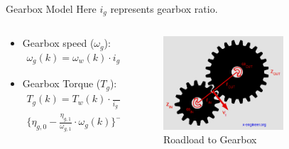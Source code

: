 \documentclass{beamer}
\begin{document}
\begin{frame}{Gearbox Model}
Here $i_g$ represents gearbox ratio.

\begin{columns}
\begin{column}{0.5\textwidth}
\begin{itemize}
    \item Gearbox speed ($\omega_g$): \\ \begin{align*}
        \omega_g(k) = \omega_w(k) \cdot i_g(k)
    \end{align*}
    
    \item Gearbox Torque ($T_g$): \\ \begin{align*}
T_g(k) = T_w(k) \cdot \frac{1}{i_g(k)} \cdot \\{\bigg\{\eta_{g,0} - \frac{\eta_{g,1}}{\omega_{g,1} } \cdot \omega_g(k)\bigg\}^{-sign(T_w(k))}}
\end{align*}
\end{itemize}
    
\end{column}
\begin{column}{0.5\textwidth}
    \begin{figure}
    \centering
        \includegraphics[width=0.7\textwidth]{gearbox model.png}
        \caption{Roadload to Gearbox}
    \end{figure}
\end{column}
\end{columns}

    
\end{frame}
\end{document}
